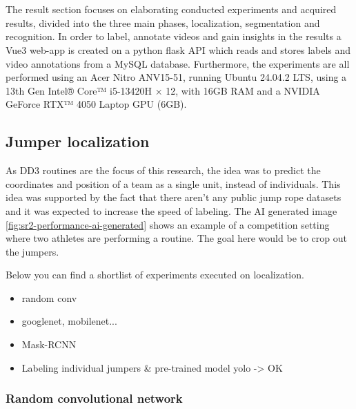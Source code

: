 
\chapter{}%
\label{ch:results}

The result section focuses on elaborating conducted experiments and acquired results, divided into the three main phases, localization, segmentation and recognition. In order to label, annotate videos and gain insights in the results a Vue3 web-app is created on a python flask API which reads and stores labels and video annotations from a MySQL database. Furthermore, the experiments are all performed using an Acer Nitro ANV15-51, running Ubuntu 24.04.2 LTS, using a 13th Gen Intel® Core™ i5-13420H × 12, with 16GB RAM and a NVIDIA GeForce RTX™ 4050 Laptop GPU (6GB).

\section{Jumper localization}

As DD3 routines are the focus of this research, the idea was to predict the coordinates and position of a team as a single unit, instead of individuals. This idea was supported by the fact that there aren't any public jump rope datasets and it was expected to increase the speed of labeling. The AI generated image \ref{fig:sr2-performance-ai-generated} shows an example of a competition setting where two athletes are performing a routine. The goal here would be to crop out the jumpers.

Below you can find a shortlist of experiments executed on localization.

\begin{itemize}
    \item random conv
    \item googlenet, mobilenet...
    \item Mask-RCNN
    \item Labeling individual jumpers \& pre-trained model yolo -> OK
\end{itemize}

\subsection{Random convolutional network}

